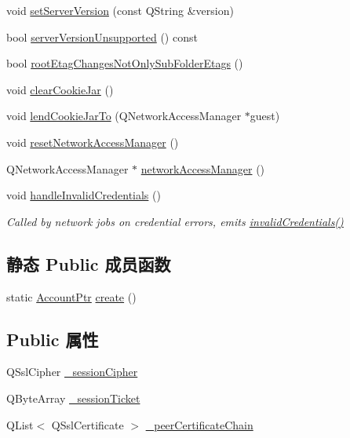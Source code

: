 \begin{DoxyCompactItemize}
void \hyperlink{class_o_c_c_1_1_account_a7c4f3564ab4a7f8fb56c77d3ebd9f7b3}{set\+Server\+Version} (const Q\+String \&version)
\item 
bool \hyperlink{class_o_c_c_1_1_account_aed1104158445e18c4fb5f8ee132ffd3d}{server\+Version\+Unsupported} () const
\item 
bool \hyperlink{class_o_c_c_1_1_account_abf4e086c092588bba0f66e300d351d26}{root\+Etag\+Changes\+Not\+Only\+Sub\+Folder\+Etags} ()
\item 
void \hyperlink{class_o_c_c_1_1_account_a76bbbb50a9d4ffc998857a7ab982999f}{clear\+Cookie\+Jar} ()
\item 
void \hyperlink{class_o_c_c_1_1_account_ab51f897fa5e5ecc46a8d87098736f161}{lend\+Cookie\+Jar\+To} (Q\+Network\+Access\+Manager $\ast$guest)
\item 
void \hyperlink{class_o_c_c_1_1_account_adf732607252214b01c20e7a7987e5b63}{reset\+Network\+Access\+Manager} ()
\item 
Q\+Network\+Access\+Manager $\ast$ \hyperlink{class_o_c_c_1_1_account_a1b9b895345cb7854c5048261de7cec06}{network\+Access\+Manager} ()
\item 
void \hyperlink{class_o_c_c_1_1_account_a3df5d30b88c86ec96f066a5a01373156}{handle\+Invalid\+Credentials} ()
\begin{DoxyCompactList}\small\item\em Called by network jobs on credential errors, emits \hyperlink{class_o_c_c_1_1_account_aeb4f6dd55bbe3c921f80bbc34bd82c0c}{invalid\+Credentials()} \end{DoxyCompactList}\end{DoxyCompactItemize}
\subsection*{静态 Public 成员函数}
\begin{DoxyCompactItemize}
\item 
static \hyperlink{namespace_o_c_c_a848616aedb9188e223c6b9867757fe69}{Account\+Ptr} \hyperlink{class_o_c_c_1_1_account_a61ead0e7524c24748cc58d248dd8085e}{create} ()
\end{DoxyCompactItemize}
\subsection*{Public 属性}
\begin{DoxyCompactItemize}
\item 
Q\+Ssl\+Cipher \hyperlink{class_o_c_c_1_1_account_a01b525231bcd14daacbe25634398d19d}{\+\_\+session\+Cipher}
\item 
Q\+Byte\+Array \hyperlink{class_o_c_c_1_1_account_a017f80dfc356869ad38f036ed726811e}{\+\_\+session\+Ticket}
\item 
Q\+List$<$ Q\+Ssl\+Certificate $>$ \hyperlink{class_o_c_c_1_1_account_ab5d15b7498823a08db6c8b9f07573a7d}{\+\_\+peer\+Certificate\+Chain}
\end{DoxyCompactItemize}
